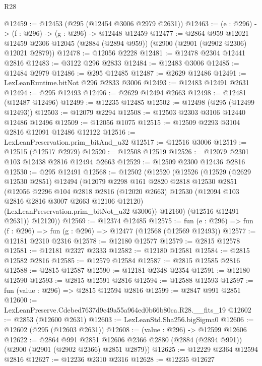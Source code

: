 \begin{lexlean}{R28}
\begin{coremodule}
@12459 := @12453 (@295 (@12454 @3006 @2979 @2631))
@12463 := (e : @296) -> (f : @296) -> (g : @296) -> @12448 @12459
@12477 := @2864
    @959
    @12021
    @12459
    @2306
    @12045
    (@2884 (@2894 @959))
    (@2900 (@2901 (@2902 @2306) @12021 @2879))
@12478 := @12056 @2228
@12481 := @12478 @2304 @12441 @2816
@12483 := @3122 @296 @2833
@12484 := @12483 @3006
@12485 := @12484 @2979
@12486 := @295 @12485
@12487 := @2629 @12486
@12491 := LexLeanRuntime.bitNot @296 @2833 @3006
@12493 := @12483 @12491 @2631
@12494 := @295 @12493
@12496 := @2629 @12494 @2663
@12498 := @12481 (@12487 @12496)
@12499 := @12235 @12485
@12502 := @12498 (@295 (@12499 @12493))
@12503 := @12079 @2294
@12508 := @12503 @2303 @3106 @12440 @12486 @12496
@12509 := @12056 @1075
@12515 := @12509 @2293 @3104 @2816 @12091 @12486 @12122
@12516 := LexLeanPreservation.prim_bitAnd_u32
@12517 := @12516 @3006
@12519 := @12515 (@12517 @2979)
@12520 := @12508 @12519
@12526 := @12079 @2301 @103 @12438 @2816 @12494 @2663
@12529 := @12509 @2300 @12436 @2816
@12530 := @295 @12491
@12568 := @12502
    (@12520
      (@12526
        (@12529
          (@2629 @12530 @2851)
          @12494
          (@12079
            @2298
            @161
            @2820
            @2818
            @12530
            @2851
            (@12056
              @2296
              @104
              @2818
              @2816
              (@12020 @2663)
              @12530
              (@12094 @103 @2816 @2816 @3007 @2663 @12106 @12120)
              (LexLeanPreservation.prim_bitNot_u32 @3006))
            @12160)
          (@12516 @12491 @2631))
        @12120))
@12569 := @12374 @12485
@12575 := fun (e : @296) => fun (f : @296) => fun (g : @296) => @12477 (@12568 (@12569 @12493))
@12577 := @12181 @2310 @2316
@12578 := @12180 @12577
@12579 := @2815 @12578
@12581 := @12181 @2327 @2333
@12582 := @12180 @12581
@12584 := @2815 @12582 @2816
@12585 := @12579 @12584
@12587 := @2815 @12585 @2816
@12588 := @2815 @12587
@12590 := @12181 @2348 @2354
@12591 := @12180 @12590
@12593 := @2815 @12591 @2816
@12594 := @12588 @12593
@12597 := fun (value : @296) => @2815 @12594 @2816
@12599 := @2847 @991 @2851
@12600 := LexLeanPreserve.Cdebed7637d9c49a55a964ed0b66b80ca.R28.__fits_19
@12602 := @2853 (@12600 @2631)
@12603 := LexLeanStd.Sha256.bigSigma0
@12606 := @12602 (@295 (@12603 @2631))
@12608 := (value : @296) -> @12599 @12606
@12622 := @2864
    @991
    @2851
    @12606
    @2366
    @2880
    (@2884 (@2894 @991))
    (@2900 (@2901 (@2902 @2366) @2851 @2879))
@12625 := @12229 @2364 @12594 @2816
@12627 := @12236 @2310 @2316
@12628 := @12235 @12627

\end{coremodule}
\end{lexlean}
